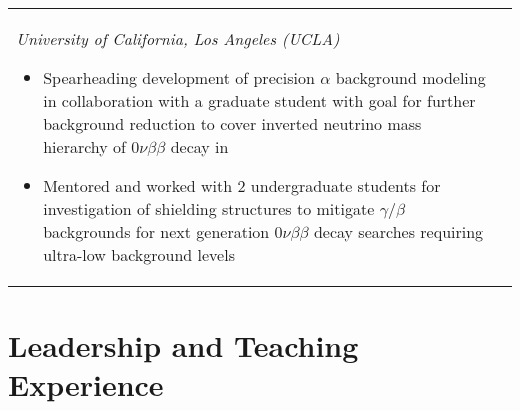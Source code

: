 \documentclass[10pt]{article} %
\begin{document}
\begin{tabularx}{\linewidth}{@{}lR@{}}
{\begin{minipage}[t]{\linewidth}
		\textit{University of California, Los Angeles (UCLA)}
		\begin{itemize}
			\item Spearheading development of precision $\alpha$ background
				modeling in collaboration with a graduate student with goal for
				further background reduction to cover inverted neutrino mass
				hierarchy of $0\nu\beta\beta$ decay in 
			\item Mentored and worked with 2 undergraduate students for
				investigation of shielding structures to mitigate
				$\gamma$/$\beta$ backgrounds for next generation
				$0\nu\beta\beta$ decay searches requiring ultra-low background
				levels
		\end{itemize}
	\end{minipage}}\\
\end{tabularx}


\section{Leadership and Teaching Experience}
\end{document}
